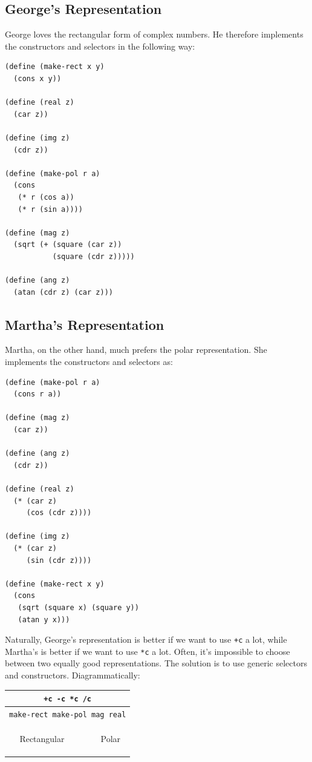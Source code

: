 \documentclass[9pt]{report}
\begin{document}
\subsection{George's Representation}
\label{sec:org7d5c3e3}

George loves the rectangular form of complex numbers. He therefore
implements the constructors and selectors in the following way:

\begin{verbatim}
(define (make-rect x y)
  (cons x y))

(define (real z)
  (car z))

(define (img z)
  (cdr z))

(define (make-pol r a)
  (cons
   (* r (cos a))
   (* r (sin a))))

(define (mag z)
  (sqrt (+ (square (car z))
           (square (cdr z)))))

(define (ang z)
  (atan (cdr z) (car z)))
\end{verbatim}

\subsection{Martha's Representation}
\label{sec:orgda04b5c}
Martha, on the other hand, much prefers the polar representation.
She implements the constructors and selectors as:

\begin{verbatim}
(define (make-pol r a)
  (cons r a))

(define (mag z)
  (car z))

(define (ang z)
  (cdr z))

(define (real z)
  (* (car z)
     (cos (cdr z))))

(define (img z)
  (* (car z)
     (sin (cdr z))))

(define (make-rect x y)
  (cons
   (sqrt (square x) (square y))
   (atan y x)))
\end{verbatim}

Naturally, George's representation is better if we want to use
\texttt{+c} a lot, while Martha's is better if we want to use \texttt{*c} a lot.
Often, it's impossible to choose between two equally good
representations. The solution is to use generic selectors and
constructors. Diagrammatically:

\begin{center}
\begin{tabular}[H]{|c|c|c|}
\hline
\multicolumn{3}{|c|}{\texttt{+c -c *c /c}}\\
\hline
\multicolumn{3}{|c|}{\texttt{make-rect make-pol mag real}}\\
\hline
&  &\\
&  &\\
&  &\\
Rectangular &  & Polar\\
&  &\\
&  &\\
&  &\\
\hline
\end{tabular}
\end{center}
\end{document}
